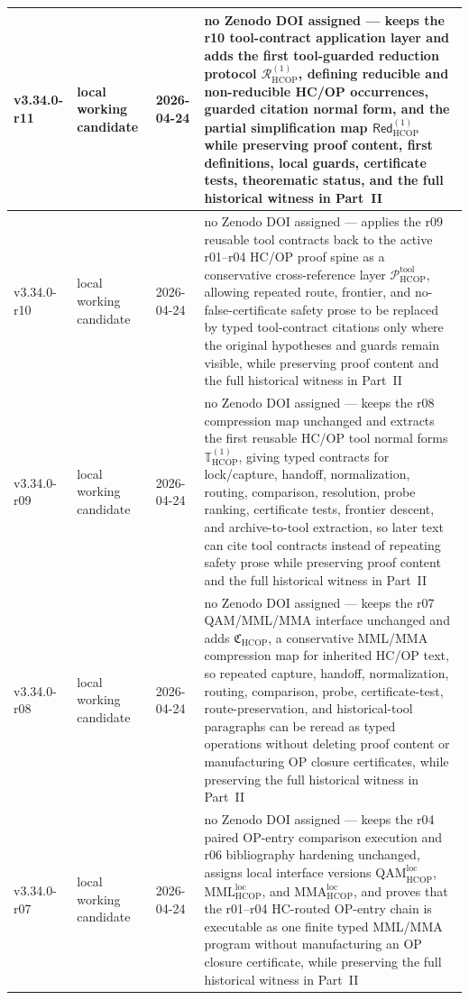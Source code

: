 {\begin{longtable}{|p{}|p{}|p{}|p{}|}
\hline
v3.34.0-r11 & local working candidate & 2026-04-24 & no Zenodo DOI assigned --- keeps the r10 tool-contract application layer and adds the first tool-guarded reduction protocol \(\mathcal R_{\mathrm{HCOP}}^{(1)}\), defining reducible and non-reducible HC/OP occurrences, guarded citation normal form, and the partial simplification map \(\mathsf{Red}_{\mathrm{HCOP}}^{(1)}\) while preserving proof content, first definitions, local guards, certificate tests, theorematic status, and the full historical witness in Part~II \\
\hline
v3.34.0-r10 & local working candidate & 2026-04-24 & no Zenodo DOI assigned --- applies the r09 reusable tool contracts back to the active r01--r04 HC/OP proof spine as a conservative cross-reference layer \(\mathcal P_{\mathrm{HCOP}}^{\mathrm{tool}}\), allowing repeated route, frontier, and no-false-certificate safety prose to be replaced by typed tool-contract citations only where the original hypotheses and guards remain visible, while preserving proof content and the full historical witness in Part~II \\
\hline
v3.34.0-r09 & local working candidate & 2026-04-24 & no Zenodo DOI assigned --- keeps the r08 compression map unchanged and extracts the first reusable HC/OP tool normal forms \(\mathbb T_{\mathrm{HCOP}}^{(1)}\), giving typed contracts for lock/capture, handoff, normalization, routing, comparison, resolution, probe ranking, certificate tests, frontier descent, and archive-to-tool extraction, so later text can cite tool contracts instead of repeating safety prose while preserving proof content and the full historical witness in Part~II \\
\hline
v3.34.0-r08 & local working candidate & 2026-04-24 & no Zenodo DOI assigned --- keeps the r07 QAM/MML/MMA interface unchanged and adds \(\mathfrak C_{\mathrm{HCOP}}\), a conservative MML/MMA compression map for inherited HC/OP text, so repeated capture, handoff, normalization, routing, comparison, probe, certificate-test, route-preservation, and historical-tool paragraphs can be reread as typed operations without deleting proof content or manufacturing OP closure certificates, while preserving the full historical witness in Part~II \\
\hline
v3.34.0-r07 & local working candidate & 2026-04-24 & no Zenodo DOI assigned --- keeps the r04 paired OP-entry comparison execution and r06 bibliography hardening unchanged, assigns local interface versions \(\mathrm{QAM}_{\mathrm{HCOP}}^{\mathrm{loc}}\), \(\mathrm{MML}_{\mathrm{HCOP}}^{\mathrm{loc}}\), and \(\mathrm{MMA}_{\mathrm{HCOP}}^{\mathrm{loc}}\), and proves that the r01--r04 HC-routed OP-entry chain is executable as one finite typed MML/MMA program without manufacturing an OP closure certificate, while preserving the full historical witness in Part~II \\

\end{longtable}}
